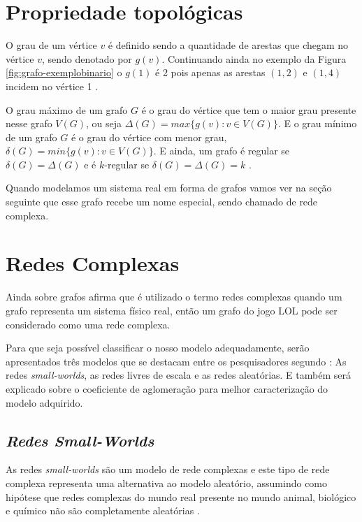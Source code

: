 \section{Propriedade topológicas}

O grau de um vértice \(v\) é definido sendo a quantidade de arestas que chegam no vértice \(v\), sendo denotado por \(g(v)\). Continuando ainda no exemplo da Figura \ref{fig:grafo-exemplobinario} o \(g(1)\) é 2 pois apenas as arestas \((1,2)\) e \((1,4)\) incidem no vértice 1 \cite{grafosucinto}.

O grau máximo de um grafo \(G\) é o grau do vértice que tem o maior grau presente nesse grafo \(V(G)\), ou seja \(\Delta(G) = max\{g(v) : v \in V(G)\}\). E o grau mínimo de um grafo \(G\) é o grau do vértice com menor grau, \(\delta(G) = min\{g(v) : v \in V(G)\}\). E ainda, um grafo é regular se \(\delta(G) = \Delta(G)\) e é \(k\)-regular se \(\delta(G) = \Delta(G) = k\) \cite{grafosucinto}.


Quando modelamos um sistema real em forma de grafos vamos ver na seção seguinte que esse grafo recebe um nome especial, sendo chamado de rede complexa.

\section{Redes Complexas}
\label{chap:redecomplexa}
Ainda sobre grafos \citet{Viana2007} afirma que é utilizado o termo redes complexas quando um grafo representa um sistema físico real, então um grafo do jogo LOL pode ser considerado como uma rede complexa.

Para que seja possível classificar o nosso modelo adequadamente, serão apresentados três modelos que se destacam entre os pesquisadores segundo \citet{albert2002statistical}: As redes \textit{small-worlds}, as redes livres de escala e as redes aleatórias. E também será explicado sobre o coeficiente de aglomeração para melhor caracterização do modelo adquirido.

\subsection{\textit{Redes Small-Worlds}}
 As redes \textit{small-worlds} são um modelo de rede complexas e este tipo de rede complexa representa uma alternativa ao modelo aleatório, assumindo como hipótese que redes complexas do mundo real presente no mundo animal, biológico e químico não são completamente aleatórias \cite{watts1998collective, lopes2011redes}. 
 
